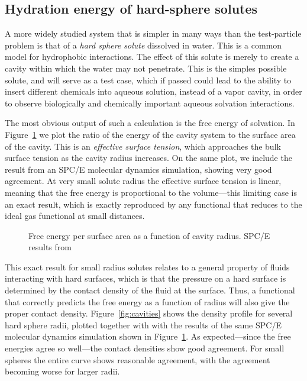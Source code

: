 \documentclass[letterpaper,twocolumn,amsmath,amssymb,prb]{revtex4}
\begin{document}
\subsection{Hydration energy of hard-sphere solutes}

A more widely studied system that is simpler in many ways than the
test-particle problem is that of a \emph{hard sphere solute} dissolved
in water.  This is a common model for hydrophobic interactions.  The
effect of this solute is merely to create a cavity within which the
water may not penetrate.  This is the simples possible solute, and
will serve as a test case, which if passed could lead to the ability
to insert different chemicals into aqueous solution, instead of a
vapor cavity, in order to observe biologically and chemically
important aqueous solvation interactions.

The most obvious output of such a calculation is the free energy of
solvation.  In Figure~\ref{fig:surfaceTension} we plot the ratio of the
energy of the cavity system to the surface area of the cavity.  This
is an \emph{effective surface tension}, which approaches the bulk
surface tension as the cavity radius increases.  On the same plot, we
include the result from an SPC/E molecular dynamics
simulation\cite{huang2001shs}, showing very good agreement.  At very
small solute radius the effective surface tension is linear, meaning
that the free energy is proportional to the volume---this limiting
case is an exact result, which is exactly reproduced by any functional
that reduces to the ideal gas functional at small distances.

\begin{figure}
\begin{center}
\end{center}
\caption{Free energy per surface area as a function of cavity
  radius. SPC/E results from~\cite{huang2001shs}}
\label{fig:surfaceTension}
\end{figure}

This exact result for small radius solutes relates to a general property of
fluids interacting with hard surfaces, which is that the pressure on a hard
surface is determined by the contact density of the fluid at the surface.
Thus, a functional that correctly predicts the free energy as a function of
radius will also give the proper contact density.
Figure~\ref{fig:cavities} shows the density profile for several hard sphere
radii, plotted together with with the results of the same SPC/E molecular
dynamics simulation shown in
Figure~\ref{fig:surfaceTension}\cite{huang2001shs}.  As expected---since
the free energies agree so well---the contact densities show good
agreement.  For small spheres the entire curve shows reasonable agreement,
with the agreement becoming worse for larger radii.
\end{document}
